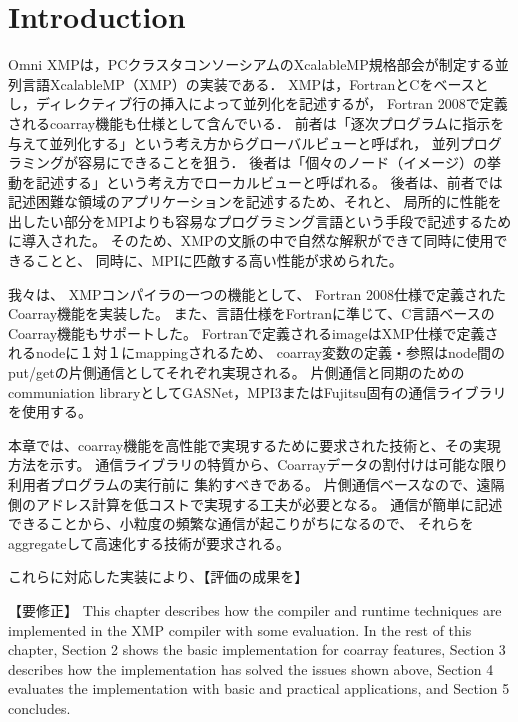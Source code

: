\section{Introduction}\label{chap:intro}

\setcounter{page}{1}

Omni XMPは，PCクラスタコンソーシアムのXcalableMP規格部会が制定する並列言語XcalableMP（XMP）の実装である．
XMPは，FortranとCをベースとし，ディレクティブ行の挿入によって並列化を記述するが，
Fortran 2008で定義されるcoarray機能も仕様として含んでいる．
前者は「逐次プログラムに指示を与えて並列化する」という考え方からグローバルビューと呼ばれ，
並列プログラミングが容易にできることを狙う．
後者は「個々のノード（イメージ）の挙動を記述する」という考え方でローカルビューと呼ばれる。
後者は、前者では記述困難な領域のアプリケーションを記述するため、それと、
局所的に性能を出したい部分をMPIよりも容易なプログラミング言語という手段で記述するために導入された。
そのため、XMPの文脈の中で自然な解釈ができて同時に使用できることと、
同時に、MPIに匹敵する高い性能が求められた。

我々は、
XMPコンパイラの一つの機能として、
Fortran 2008仕様で定義されたCoarray機能を実装した。
また、言語仕様をFortranに準じて、C言語ベースのCoarray機能もサポートした。
Fortranで定義されるimageはXMP仕様で定義されるnodeに１対１にmappingされるため、
coarray変数の定義・参照はnode間のput/getの片側通信としてそれぞれ実現される。
片側通信と同期のためのcommuniation libraryとしてGASNet，MPI3またはFujitsu固有の通信ライブラリを使用する。

本章では、coarray機能を高性能で実現するために要求された技術と、その実現方法を示す。
通信ライブラリの特質から、Coarrayデータの割付けは可能な限り利用者プログラムの実行前に
集約すべきである。
片側通信ベースなので、遠隔側のアドレス計算を低コストで実現する工夫が必要となる。
通信が簡単に記述できることから、小粒度の頻繁な通信が起こりがちになるので、
それらをaggregateして高速化する技術が要求される。

これらに対応した実装により、【評価の成果を】


【要修正】
This chapter describes how the compiler and runtime techniques are 
implemented in the XMP compiler with some evaluation. 
In the rest of this chapter, 
Section 2 shows the basic implementation for coarray features, 
Section 3 describes how the implementation has solved the issues shown above, 
Section 4 evaluates the implementation with basic and practical applications, and 
Section 5 concludes.

